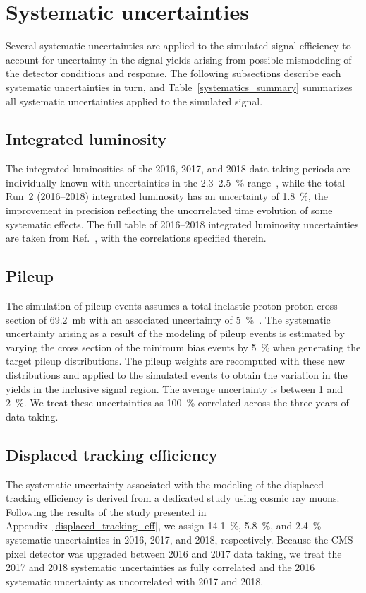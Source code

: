\section{Systematic uncertainties}
\label{systematics}
Several systematic uncertainties are applied to the simulated signal efficiency to account for uncertainty in the signal yields arising from possible mismodeling of the detector conditions and response. The following subsections describe each systematic uncertainties in turn, and Table~\ref{systematics_summary} summarizes all systematic uncertainties applied to the simulated signal.



\subsection{Integrated luminosity}
The integrated luminosities of the 2016, 2017, and 2018 data-taking periods are individually known with uncertainties in the 2.3--\SI{2.5}{\percent} range~\cite{CMS:lumi2016,CMS:lumi2017,CMS:lumi2018}, while the total Run~2 (2016--2018) integrated luminosity has an uncertainty of \SI{1.8}{\percent}, the improvement in precision reflecting the uncorrelated time evolution of some systematic effects. The full table of 2016--2018 integrated luminosity uncertainties are taken from Ref.~\cite{lumiTwiki}, with the correlations specified therein.

\subsection{Pileup}
The simulation of pileup events assumes a total inelastic proton-proton cross section of \SI{69.2}{\milli\barn} with an associated uncertainty of \SI{5}{\percent}~\cite{Sirunyan:2018nqx}. The systematic uncertainty arising as a result of the modeling of pileup events is estimated by varying the cross section of the minimum bias events by \SI{5}{\percent} when generating the target pileup distributions. The pileup weights are recomputed with these new distributions and applied to the simulated events to obtain the variation in the yields in the inclusive signal region. The average uncertainty is between 1 and \SI{2}{\percent}. We treat these uncertainties as \SI{100}{\percent} correlated across the three years of data taking.

\subsection{Displaced tracking efficiency}
The systematic uncertainty associated with the modeling of the displaced tracking efficiency is derived from a dedicated study using cosmic ray muons. Following the results of the study presented in Appendix~\ref{displaced_tracking_eff}, we assign \SI{14.1}{\percent}, \SI{5.8}{\percent}, and \SI{2.4}{\percent} systematic uncertainties in 2016, 2017, and 2018, respectively. Because the CMS pixel detector was upgraded between 2016 and 2017 data taking, we treat the 2017 and 2018 systematic uncertainties as fully correlated and the 2016 systematic uncertainty as uncorrelated with 2017 and 2018.

